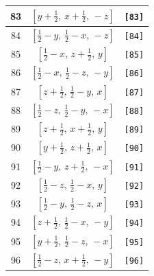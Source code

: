 \documentclass[fleqn,8pt]{jsarticle}
\begin{document}
\begin{longtable}{ccc}
83 & $\left[ y + \frac{1}{2},\, x + \frac{1}{2},\, - z \right]$ & {\tt [83]} \\ \hline
84 & $\left[ \frac{1}{2} - y,\, \frac{1}{2} - x,\, - z \right]$ & {\tt [84]} \\ \hline
85 & $\left[ \frac{1}{2} - x,\, z + \frac{1}{2},\, y \right]$ & {\tt [85]} \\ \hline
86 & $\left[ \frac{1}{2} - x,\, \frac{1}{2} - z,\, - y \right]$ & {\tt [86]} \\ \hline
87 & $\left[ z + \frac{1}{2},\, \frac{1}{2} - y,\, x \right]$ & {\tt [87]} \\ \hline
88 & $\left[ \frac{1}{2} - z,\, \frac{1}{2} - y,\, - x \right]$ & {\tt [88]} \\ \hline
89 & $\left[ z + \frac{1}{2},\, x + \frac{1}{2},\, y \right]$ & {\tt [89]} \\ \hline
90 & $\left[ y + \frac{1}{2},\, z + \frac{1}{2},\, x \right]$ & {\tt [90]} \\ \hline
91 & $\left[ \frac{1}{2} - y,\, z + \frac{1}{2},\, - x \right]$ & {\tt [91]} \\ \hline
92 & $\left[ \frac{1}{2} - z,\, \frac{1}{2} - x,\, y \right]$ & {\tt [92]} \\ \hline
93 & $\left[ \frac{1}{2} - y,\, \frac{1}{2} - z,\, x \right]$ & {\tt [93]} \\ \hline
94 & $\left[ z + \frac{1}{2},\, \frac{1}{2} - x,\, - y \right]$ & {\tt [94]} \\ \hline
95 & $\left[ y + \frac{1}{2},\, \frac{1}{2} - z,\, - x \right]$ & {\tt [95]} \\ \hline
96 & $\left[ \frac{1}{2} - z,\, x + \frac{1}{2},\, - y \right]$ & {\tt [96]} \\
\end{longtable}
\end{document}
